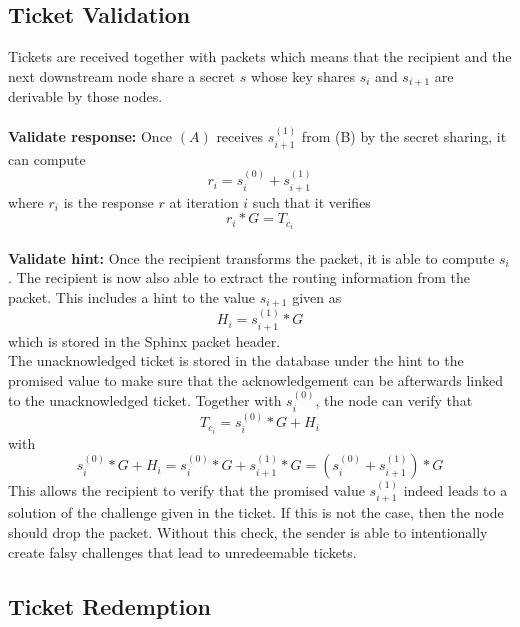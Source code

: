 \subsection{Ticket Validation}

Tickets are received together with packets which means that the recipient and the next downstream node share a secret $s$ whose key shares $s_i$ and $s_{i+1}$ are derivable by those nodes.
\\~\\ \textbf{Validate response:} Once $(A)$ receives $s_{i+1}^{(1)}$ from (B) by the secret sharing, it can compute $$r_i=s_i^{(0)}+s_{i+1}^{(1)}$$ where $r_i$ is the response $r$ at iteration $i$ such that it verifies
$$r_i*G=T_{c_i}$$
\\\textbf{Validate hint:} Once the recipient transforms the packet, it is able to compute $s_i$. The recipient is now also able to extract the routing information from the packet.
This includes a hint to the value $s_{i+1}$ given as $$H_i=s_{i+1}^{(1)}*G$$ which is stored in the Sphinx packet header.
\\The unacknowledged ticket is stored in the database under the hint to the promised value to make sure that the acknowledgement can be afterwards linked to the unacknowledged ticket.
\newline Together with $s_i^{(0)}$, the node can verify that $$T_{c_i}=s_i^{(0)}*G+H_i$$ with $$s_i^{(0)}*G+H_i=s_i^{(0)}*G+s_{i+1}^{(1)}*G=(s_i^{(0)}+s_{i+1}^{(1)})*G$$
This allows the recipient to verify that the promised value $s_{i+1}^{(1)}$ indeed leads to a solution of the challenge given in the ticket.
If this is not the case, then the node should drop the packet.
\newline Without this check, the sender is able to intentionally create falsy challenges that lead to unredeemable tickets.


\subsection{Ticket Redemption}

